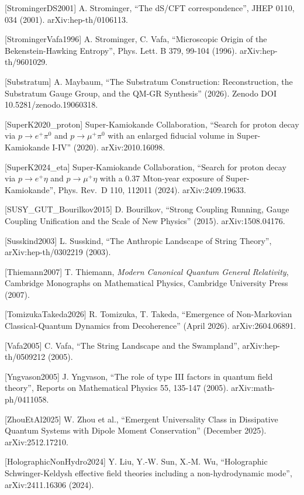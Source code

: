 \documentclass[
]{article}
\begin{document}
{[}StromingerDS2001{]} A. Strominger, ``The dS/CFT correspondence'',
JHEP 0110, 034 (2001). arXiv:hep-th/0106113.

{[}StromingerVafa1996{]} A. Strominger, C. Vafa, ``Microscopic Origin of
the Bekenstein-Hawking Entropy'', Phys. Lett. B 379, 99-104 (1996).
arXiv:hep-th/9601029.

{[}Substratum{]} A. Maybaum, ``The Substratum Construction:
Reconstruction, the Substratum Gauge Group, and the QM-GR Synthesis''
(2026). Zenodo DOI 10.5281/zenodo.19060318.

{[}SuperK2020\_proton{]} Super-Kamiokande Collaboration, ``Search for
proton decay via \(p \to e^+\pi^0\) and \(p \to \mu^+\pi^0\) with an
enlarged fiducial volume in Super-Kamiokande I-IV'' (2020).
arXiv:2010.16098.

{[}SuperK2024\_eta{]} Super-Kamiokande Collaboration, ``Search for
proton decay via \(p \to e^+\eta\) and \(p \to \mu^+\eta\) with a 0.37
Mton-year exposure of Super-Kamiokande'', Phys. Rev.~D 110, 112011
(2024). arXiv:2409.19633.

{[}SUSY\_GUT\_Bourilkov2015{]} D. Bourilkov, ``Strong Coupling Running,
Gauge Coupling Unification and the Scale of New Physics'' (2015).
arXiv:1508.04176.

{[}Susskind2003{]} L. Susskind, ``The Anthropic Landscape of String
Theory'', arXiv:hep-th/0302219 (2003).

{[}Thiemann2007{]} T. Thiemann, \emph{Modern Canonical Quantum General
Relativity}, Cambridge Monographs on Mathematical Physics, Cambridge
University Press (2007).

{[}TomizukaTakeda2026{]} R. Tomizuka, T. Takeda, ``Emergence of
Non-Markovian Classical-Quantum Dynamics from Decoherence'' (April
2026). arXiv:2604.06891.

{[}Vafa2005{]} C. Vafa, ``The String Landscape and the Swampland'',
arXiv:hep-th/0509212 (2005).

{[}Yngvason2005{]} J. Yngvason, ``The role of type III factors in
quantum field theory'', Reports on Mathematical Physics 55, 135-147
(2005). arXiv:math-ph/0411058.

{[}ZhouEtAl2025{]} W. Zhou et al., ``Emergent Universality Class in
Dissipative Quantum Systems with Dipole Moment Conservation'' (December
2025). arXiv:2512.17210.

{[}HolographicNonHydro2024{]} Y. Liu, Y.-W. Sun, X.-M. Wu, ``Holographic
Schwinger-Keldysh effective field theories including a non-hydrodynamic
mode'', arXiv:2411.16306 (2024).
\end{document}
